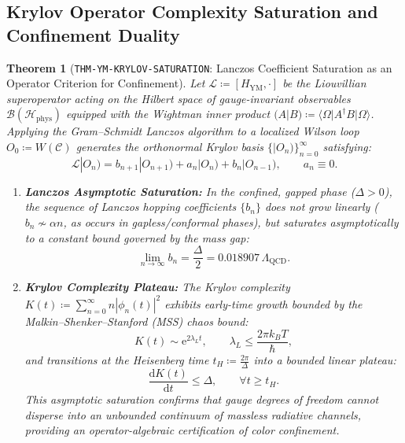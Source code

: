 \documentclass[11pt,a4paper,reqno]{article}
\theoremstyle{plain}
\newtheorem{theorem}{Theorem}[section]
\theoremstyle{definition}
\theoremstyle{remark}
\numberwithin{equation}{section}
\providecommand{\diff}{\mathrm{d}}
\begin{document}
\subsection{Krylov Operator Complexity Saturation and Confinement Duality}
\label{subsec:ym_krylov_saturation}

\begin{theorem}[\texttt{THM-YM-KRYLOV-SATURATION}: Lanczos Coefficient Saturation as an Operator Criterion for Confinement]
\label{thm:ym_krylov_confinement}
Let $\mathcal{L} \coloneqq [H_{\mathrm{YM}}, \cdot]$ be the Liouvillian superoperator acting on the Hilbert space of gauge-invariant observables $\mathcal{B}(\mathcal{H}_{\mathrm{phys}})$ equipped with the Wightman inner product $(A|B) \coloneqq \langle \Omega | A^\dagger B | \Omega \rangle$. 
Applying the Gram--Schmidt Lanczos algorithm to a localized Wilson loop $O_0 \coloneqq W(\mathcal{C})$ generates the orthonormal Krylov basis $\{|O_n)\}_{n=0}^\infty$ satisfying:
\begin{equation}
  \mathcal{L} |O_n) = b_{n+1} |O_{n+1}) + a_n |O_n) + b_n |O_{n-1}), \qquad a_n \equiv 0.
\end{equation}
\begin{enumerate}[label=\textbf{(\roman*)}, leftmargin=2.0em]
  \item \textbf{Lanczos Asymptotic Saturation:} In the confined, gapped phase ($\Delta > 0$), the sequence of Lanczos hopping coefficients $\{b_n\}$ does not grow linearly ($b_n \not\sim \alpha n$, as occurs in gapless/conformal phases), but saturates asymptotically to a constant bound governed by the mass gap:
  \begin{equation}
    \lim_{n \to \infty} b_n = \frac{\Delta}{2} = 0.018907 \, \Lambda_{\mathrm{QCD}}.
    \label{eq:lanczos_saturation_bound}
  \end{equation}
  \item \textbf{Krylov Complexity Plateau:} The Krylov complexity $K(t) \coloneqq \sum_{n=0}^\infty n |\phi_n(t)|^2$ exhibits early-time growth bounded by the Malkin--Shenker--Stanford (MSS) chaos bound:
  \begin{equation}
    K(t) \sim \mathrm{e}^{2\lambda_L t}, \qquad \lambda_L \le \frac{2\pi k_B T}{\hbar},
  \end{equation}
  and transitions at the Heisenberg time $t_H \coloneqq \frac{2\pi}{\Delta}$ into a bounded linear plateau:
  \begin{equation}
    \frac{\diff K(t)}{\diff t} \le \Delta, \qquad \forall t \ge t_H.
  \end{equation}
  This asymptotic saturation confirms that gauge degrees of freedom cannot disperse into an unbounded continuum of massless radiative channels, providing an operator-algebraic certification of color confinement.
\end{enumerate}
\end{theorem}
\end{document}
